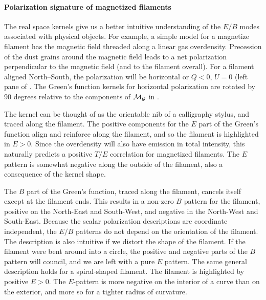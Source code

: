 \paragraph{Polarization signature of magnetized filaments}
The real space kernels give us a better intuitive understanding of the $E/B$ modes associated with physical objects.  For example, a simple model for a magnetize filament has the magnetic field threaded along a linear gas overdensity.  Precession of the dust grains around the magnetic field leads to a net polarization perpendicular to the magnetic field (and to the filament overall).  For a filament aligned North--South, the polarization will be horizontal or $Q<0$, $U=0$ (left pane of .  The Green's function kernels for horizontal polarization are rotated by 90 degrees relative to the components of $\cal{M}_G$ in .

The kernel can be thought of as the orientable nib of a calligraphy stylus, and traced along the filament.  The positive components for the $E$ part of the Green's function align and reinforce along the filament, and so the filament is highlighted in $E>0$.  Since the overdensity will also have emission in total intensity, this naturally predicts a positive $T/E$ correlation for magnetized filaments.  The $E$ pattern is somewhat negative along the outside of the filament, also a consequence of the kernel shape.

The $B$ part of the Green's function, traced along the filament, cancels itself except at the filament ends.  This results in a non-zero $B$ pattern for the filament, positive on the North-East and South-West, and negative in the North-West and South-East.  
Because the scalar polarization descriptions are coordinate independent, the $E/B$ patterns do not depend on the orientation of the filament.
The description is also intuitive if we distort the shape of the filament.  If the filament were bent around into a circle, the positive and negative parts of the $B$ pattern will council, and we are left with a pure $E$ pattern.  
The same general description holds for a spiral-shaped filament.  The filament is highlighted by positive $E>0$.  The $E$-pattern is more negative on the interior of a curve than on the exterior, and more so for a tighter radius of curvature.


